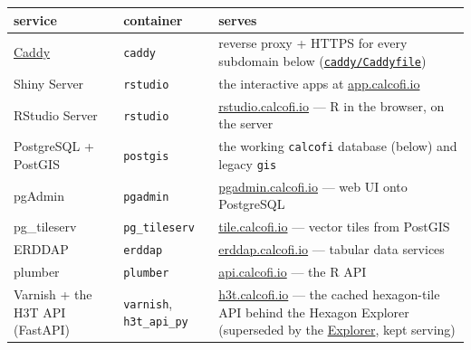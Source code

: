 \documentclass[
  letterpaper,
  DIV=11,
  numbers=noendperiod]{scrreprt}
\begin{document}
\begin{longtable}[]{@{}
  >{\raggedright\arraybackslash}p{}
  >{\raggedright\arraybackslash}p{}
  >{\raggedright\arraybackslash}p{}@{}}
\toprule\noalign{}
\begin{minipage}[b]{\linewidth}\raggedright
service
\end{minipage} & \begin{minipage}[b]{\linewidth}\raggedright
container
\end{minipage} & \begin{minipage}[b]{\linewidth}\raggedright
serves
\end{minipage} \\
\midrule\noalign{}
\endhead
\bottomrule\noalign{}
\endlastfoot
\href{https://caddyserver.com/}{Caddy} & \texttt{caddy} & reverse proxy
+ HTTPS for every subdomain below
(\href{https://github.com/CalCOFI/server/blob/main/caddy/Caddyfile}{\texttt{caddy/Caddyfile}}) \\
Shiny Server & \texttt{rstudio} & the interactive apps at
\href{https://app.calcofi.io/hex/}{app.calcofi.io} \\
RStudio Server & \texttt{rstudio} &
\href{https://rstudio.calcofi.io}{rstudio.calcofi.io} --- R in the
browser, on the server \\
PostgreSQL + PostGIS & \texttt{postgis} & the working \texttt{calcofi}
database (below) and legacy \texttt{gis} \\
pgAdmin & \texttt{pgadmin} &
\href{https://pgadmin.calcofi.io}{pgadmin.calcofi.io} --- web UI onto
PostgreSQL \\
pg\_tileserv & \texttt{pg\_tileserv} &
\href{https://tile.calcofi.io}{tile.calcofi.io} --- vector tiles from
PostGIS \\
ERDDAP & \texttt{erddap} &
\href{https://erddap.calcofi.io/erddap/}{erddap.calcofi.io} --- tabular
data services \\
plumber & \texttt{plumber} &
\href{https://api.calcofi.io}{api.calcofi.io} --- the R API \\
Varnish + the H3T API (FastAPI) & \texttt{varnish},
\texttt{h3t\_api\_py} &
\href{https://h3t.calcofi.io/docs}{h3t.calcofi.io} --- the cached
hexagon-tile API behind the Hexagon Explorer (superseded by the
\href{https://calcofi.io/explore/}{Explorer}, kept serving) \\
\end{longtable}
\end{document}
